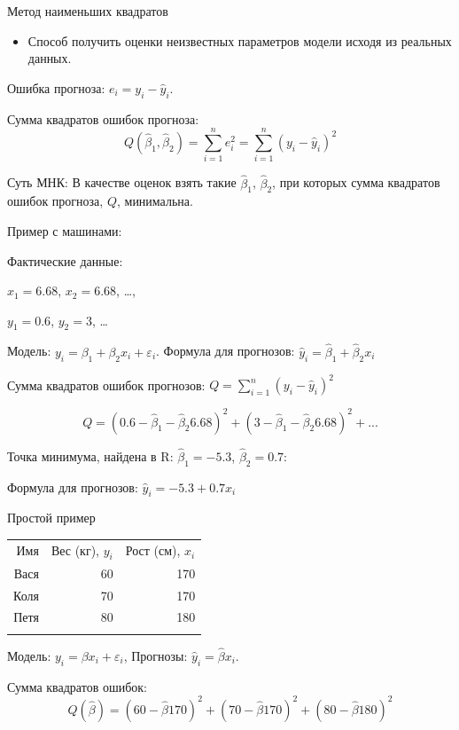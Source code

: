 \documentclass[ignorenonframetext,]{beamer}
\begin{document}
\begin{frame}{Метод наименьших квадратов}

\begin{itemize}
\itemsep1pt\parskip0pt
\item
  Способ получить оценки неизвестных параметров модели исходя из
  реальных данных.
\end{itemize}

Ошибка прогноза: $e_i=y_i-\hat{y}_i$.

Сумма квадратов ошибок прогноза: \[
Q(\hat{\beta}_1,\hat{\beta}_2)=\sum_{i=1}^n e_i^2=\sum_{i=1}^n (y_i-\hat{y}_i)^2
\]

Суть МНК: В качестве оценок взять такие $\hat{\beta}_1$,
$\hat{\beta}_2$, при которых сумма квадратов ошибок прогноза, $Q$,
минимальна.

\end{frame}

\begin{frame}{Пример с машинами:}

Фактические данные:

$x_1=6.68$, $x_2=6.68$, \ldots{},

$y_1=0.6$, $y_2=3$, \ldots{}

Модель: $y_i=\beta_1+\beta_2 x_i+\varepsilon_i$. Формула для прогнозов:
$\hat{y}_i=\hat{\beta}_1 + \hat{\beta}_2 x_i$

Сумма квадратов ошибок прогнозов: $Q=\sum_{i=1}^n (y_i-\hat{y}_i)^2$

\[
Q=(0.6-\hat{\beta}_1-\hat{\beta}_2 6.68)^2+(3-\hat{\beta}_1-\hat{\beta}_2 6.68)^2+...
\]

Точка минимума, найдена в R: $\hat{\beta}_1=-5.3$, $\hat{\beta}_2=0.7$:

Формула для прогнозов: $\hat{y}_i=-5.3 + 0.7 x_i$

\end{frame}

\begin{frame}{Простой пример}

\begin{longtable}[c]{@{}rrr@{}}
\toprule\addlinespace
Имя & Вес (кг), $y_i$ & Рост (см), $x_i$
\\\addlinespace
\midrule\endhead
Вася & 60 & 170
\\\addlinespace
Коля & 70 & 170
\\\addlinespace
Петя & 80 & 180
\\\addlinespace
\bottomrule
\end{longtable}

Модель: $y_i=\beta x_i +\varepsilon_i$, Прогнозы:
$\hat{y}_i=\hat{\beta}x_i$.

Сумма квадратов ошибок: \[
Q(\hat{\beta})=(60-\hat{\beta}170)^2+(70-\hat{\beta}170)^2+(80-\hat{\beta}180)^2
\]

\end{frame}
\end{document}
